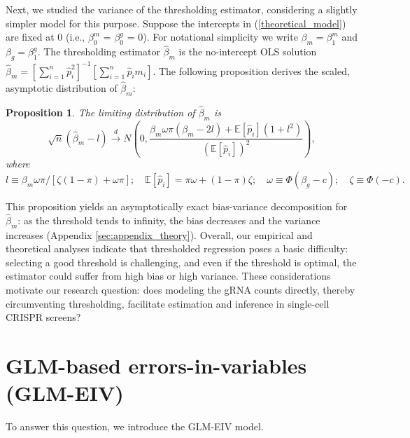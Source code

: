\documentclass[12pt]{article}
\newtheorem{proposition}{Proposition}
\begin{document}
Next, we studied the variance of the thresholding estimator, considering a slightly simpler model for this purpose. Suppose the intercepts in (\ref{theoretical_model}) are fixed at $0$ (i.e., $\beta^m_0$ = $\beta^g_0$ = 0). For notational simplicity we write $\beta_m = \beta^m_1$ and $\beta_g = \beta^g_1.$ The thresholding estimator $\hat{\beta}_m$ is the no-intercept OLS solution $\hat{\beta}_m = \left[\sum_{i=1}^n \hat{p}_i^2 \right]^{-1}\left[\sum_{i=1}^n \hat{p}_i m_i \right].$ The following proposition derives the scaled, asymptotic distribution of $\hat{\beta}_m:$
\begin{proposition}\label{prop:bv_decomp}
	The limiting distribution of $\hat{\beta}_m$ is
	$$\sqrt{n}(\hat{\beta}_m - l) \xrightarrow{d} N\left(0, \frac{ \beta_m \omega\pi(\beta_m - 2l) + \mathbb{E}[\hat{p}_i](1 + l^2) }{\left(\mathbb{E}[\hat{p}_i]\right)^2} \right),$$ where $$l \equiv \beta_m \omega \pi/[\zeta(1-\pi) + \omega \pi]; \quad
	\mathbb{E}[\hat{p}_i] = \pi \omega + (1-\pi) \zeta; \quad
	\omega \equiv \Phi(\beta_g - c); \quad
	\zeta \equiv \Phi(-c).$$
\end{proposition}
This proposition yields an asymptotically exact bias-variance decomposition for $\hat{\beta}_m$: as the threshold tends to infinity, the bias decreases and the variance increases (Appendix \ref{sec:appendix_theory}). Overall, our empirical and theoretical analyses indicate that thresholded regression poses a basic difficulty: selecting a good threshold is challenging, and even if the threshold is optimal, the estimator could suffer from high bias or high variance. These considerations motivate our research question: does modeling the gRNA counts directly, thereby circumventing thresholding, facilitate estimation and inference in single-cell CRISPR screens?

\section{GLM-based errors-in-variables (GLM-EIV)}

To answer this question, we introduce the GLM-EIV model.
\end{document}
